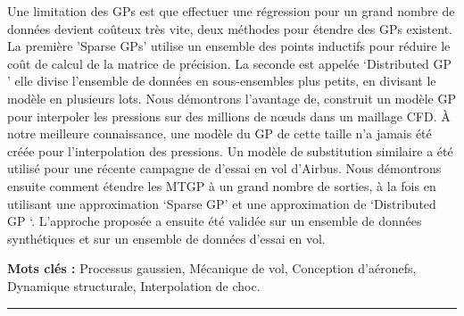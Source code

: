 Une limitation des GPs est que effectuer une régression pour un grand nombre de données devient coûteux très vite, deux méthodes pour étendre des GPs existent. La première 'Sparse GPs' utilise un ensemble des points inductifs pour réduire le coût de calcul de la matrice de précision. La seconde est appelée `Distributed GP ' elle divise l'ensemble de données en sous-ensembles plus petits, en divisant le modèle en plusieurs lots. Nous démontrons l’avantage de, construit un modèle GP pour interpoler les pressions sur des millions de nœuds dans un maillage CFD. À notre meilleure connaissance, une modèle du GP de cette taille n'a jamais été créée pour l'interpolation des pressions. Un modèle de substitution similaire a été utilisé pour une récente campagne de d'essai en vol d'Airbus. Nous démontrons ensuite comment étendre les MTGP à un grand nombre de sorties, à la fois en utilisant une approximation `Sparse GP’ et une approximation de `Distributed GP ‘. L'approche proposée a ensuite été validée sur un ensemble de données synthétiques et sur un ensemble de données d'essai en vol.

{\large\textbf{Mots clés :}}
    Processus gaussien, Mécanique de vol, Conception d'aéronefs, Dynamique structurale, Interpolation de choc.
\\
\noindent\rule[2pt]{\textwidth}{0.5pt}






